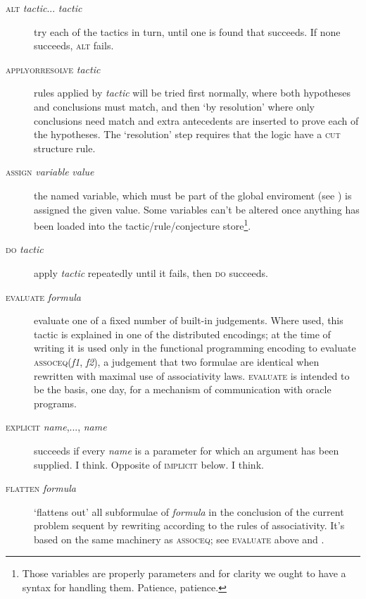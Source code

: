 \begin{description}
\item[\textsc{alt} \textit{tactic}... \textit{tactic}] try each of the tactics in turn, until one is found that succeeds. If none succeeds, \textsc{alt} fails.


\item [\textsc{applyorresolve} \textit{tactic}] rules applied by \textit{tactic} will be tried first normally, where both hypotheses and conclusions must match, and then `by resolution' where only conclusions need match and extra antecedents are inserted to prove each of the hypotheses. The `resolution' step requires that the logic have a \textsc{cut} structure rule.


\item [\textsc{assign} \textit{variable} \textit{value}] the named variable, which must be part of the global enviroment (see ) is assigned the given value. Some variables can't be altered once anything has been loaded into the tactic/rule/conjecture store\footnote{Those variables are properly parameters and for clarity we ought to have a syntax for handling them. Patience, patience.}.


\item [\textsc{do} \textit{tactic}] apply \textit{tactic} repeatedly until it fails, then \textsc{do} succeeds.


\item [\textsc{evaluate} \textit{formula} ] evaluate one of a fixed number of built-in judgements. Where used, this tactic is explained in one of the distributed encodings; at the time of writing it is used only in the functional programming encoding to evaluate \textsc{assoceq}(\textit{f1}, \textit{f2}), a judgement that two formulae are identical when rewritten with maximal use of associativity laws. \textsc{evaluate} is intended to be the basis, one day, for a mechanism of communication with oracle programs.


\item [\textsc{explicit} \textit{name},..., \textit{name}] succeeds if every \textit{name} is a parameter for which an argument has been supplied. I think. Opposite of \textsc{implicit} below. I think.


\item [\textsc{flatten} \textit{formula}] `flattens out' all subformulae of \textit{formula} in the conclusion of the current problem sequent by rewriting according to the rules of associativity. It's based on the same machinery as \textsc{assoceq}; see \textsc{evaluate} above and .



\end{description}
